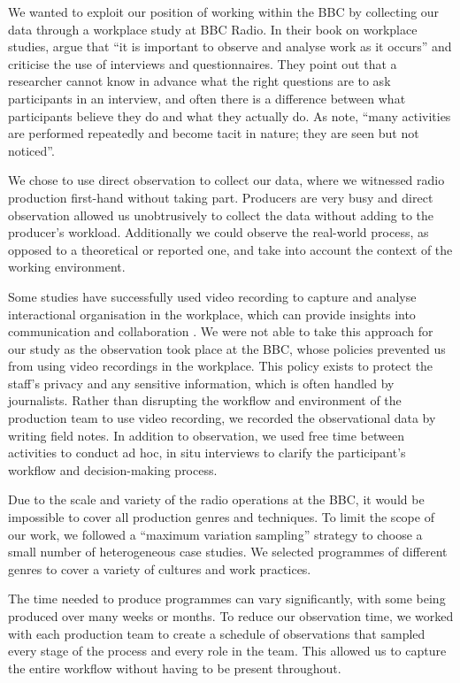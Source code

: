 We wanted to exploit our position of working within the BBC by collecting our data through a workplace study at BBC
Radio.  In their book on workplace studies, \citet{Luff2000} argue that ``it is important to observe and analyse work
as it occurs'' and criticise the use of interviews and questionnaires. They point out that a researcher cannot know in
advance what the right questions are to ask participants in an interview, and often there is a difference between what
participants believe they do and what they actually do. As \citet[p.~245]{Luff2000} note, ``many activities are
performed repeatedly and become tacit in nature; they are seen but not noticed''.

We chose to use direct observation to collect our data, where we witnessed radio production first-hand without taking
part.  Producers are very busy and direct observation allowed us unobtrusively to collect the data without adding to
the producer's workload. Additionally we could observe the real-world process, as opposed to a theoretical or reported
one, and take into account the context of the working environment.

Some studies have successfully used video recording to capture and analyse interactional organisation in the workplace,
which can provide insights into communication and collaboration \citep[p.~16]{Luff2000}.  We were not able to take this
approach for our study as the observation took place at the BBC, whose policies prevented us from using video
recordings in the workplace.  This policy exists to protect the staff's privacy and any sensitive information, which is
often handled by journalists.  Rather than disrupting the workflow and environment of the production team to use video
recording, we recorded the observational data by writing field notes.  In addition to observation, we used free time
between activities to conduct ad hoc, in situ interviews to clarify the participant's workflow and decision-making
process.

Due to the scale and variety of the radio operations at the BBC, it would be impossible to cover all production genres
and techniques. To limit the scope of our work, we followed a ``maximum variation sampling'' strategy \citep[p.
172]{Patton1990} to choose a small number of heterogeneous case studies. We selected programmes of different genres to
cover a variety of cultures and work practices.

The time needed to produce programmes can vary significantly, with some being produced over many weeks or months. To
reduce our observation time, we worked with each production team to create a schedule of observations that sampled
every stage of the process and every role in the team. This allowed us to capture the entire workflow without having to
be present throughout.

